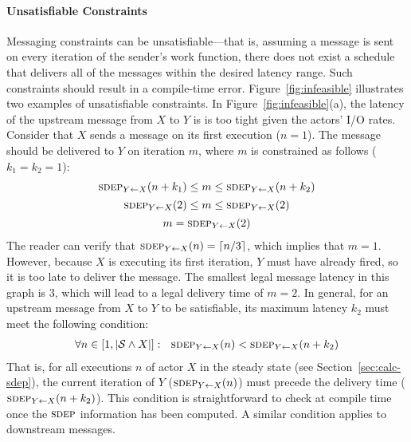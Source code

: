 \paragraph*{Unsatisfiable Constraints}  
Messaging constraints can be unsatisfiable---that is, assuming a
message is sent on every iteration of the sender's work function,
there does not exist a schedule that delivers all of the messages
within the desired latency range.  Such constraints should result in a
compile-time error.  Figure~\ref{fig:infeasible} illustrates two
examples of unsatisfiable constraints.  In
Figure~\ref{fig:infeasible}(a), the latency of the upstream message
from $X$ to $Y$ is is too tight given the actors' I/O rates.  Consider
that $X$ sends a message on its first execution ($n=1$).  The message
should be delivered to $Y$ on iteration $m$, where $m$ is constrained
as follows ($k_1 = k_2 = 1$):
\begin{equation*}
\begin{array}{c}
\sdepf{Y}{X}(n+k_1) \le m \le \sdepf{Y}{X}(n+k_2) \\[1Ex]
\sdepf{Y}{X}(2) \le m \le \sdepf{Y}{X}(2) \\[1Ex]
m = \sdepf{Y}{X}(2)
\end{array}
\vspace{-4pt}
\end{equation*}
The reader can verify that $\sdepf{Y}{X}(n) = \lceil n/3 \rceil$,
which implies that $m=1$.  However, because $X$ is executing its first
iteration, $Y$ must have already fired, so it is too late to deliver
the message.  The smallest legal message latency in this graph is 3,
which will lead to a legal delivery time of $m=2$.  In general, for an
upstream message from $X$ to $Y$ to be satisfiable, its maximum
latency $k_2$ must meet the following condition:
\begin{equation*}
\begin{array}{c}
\forall n \in [1, |{\cal S} \wedge X|]:~~\sdepf{Y}{X}(n) < \sdepf{Y}{X}(n+k_2)
\end{array}
\end{equation*}
That is, for all executions $n$ of actor $X$ in the steady state (see
Section~\ref{sec:calc-sdep}), the current iteration of $Y$
($\sdepf{Y}{X}(n)$) must precede the delivery time
($\sdepf{Y}{X}(n+k_2)$).  This condition is straightforward to check
at compile time once the $\textsc{sdep}$ information has been computed.  A
similar condition applies to downstream messages.

